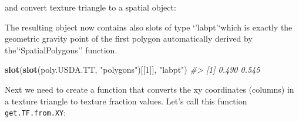 \documentclass[graybox,natbib,nospthms,UStrade]{svmono}
\newenvironment{Shaded}{\begin{snugshade}}{\end{snugshade}}
\newcommand{\CommentTok}[1]{\textcolor[rgb]{0.37,0.37,0.37}{\textit{#1}}}
\newcommand{\ControlFlowTok}[1]{\textcolor[rgb]{0.27,0.27,0.27}{\textbf{#1}}}
\newcommand{\DataTypeTok}[1]{\textcolor[rgb]{0.27,0.27,0.27}{#1}}
\newcommand{\DecValTok}[1]{\textcolor[rgb]{0.06,0.06,0.06}{#1}}
\newcommand{\FloatTok}[1]{\textcolor[rgb]{0.06,0.06,0.06}{#1}}
\newcommand{\KeywordTok}[1]{\textcolor[rgb]{0.27,0.27,0.27}{\textbf{#1}}}
\newcommand{\NormalTok}[1]{#1}
\newcommand{\OperatorTok}[1]{\textcolor[rgb]{0.43,0.43,0.43}{\textbf{#1}}}
\newcommand{\OtherTok}[1]{\textcolor[rgb]{0.37,0.37,0.37}{#1}}
\newcommand{\StringTok}[1]{\textcolor[rgb]{0.5,0.5,0.5}{#1}}
\begin{document}
and convert texture triangle to a spatial object:

\begin{Shaded}
\end{Shaded}

The resulting object now contains also slots of type `'labpt'`which is exactly the geometric gravity point of the first polygon automatically derived by the'`SpatialPolygons'' function.

\begin{Shaded}
\begin{Highlighting}[]
\KeywordTok{slot}\NormalTok{(}\KeywordTok{slot}\NormalTok{(poly.USDA.TT, }\StringTok{"polygons"}\NormalTok{)[[}\DecValTok{1}\NormalTok{]], }\StringTok{"labpt"}\NormalTok{)}
\CommentTok{#> [1] 0.490 0.545}
\end{Highlighting}
\end{Shaded}

Next we need to create a function that converts the xy coordinates (columns) in a texture triangle to texture fraction values. Let's call this function \texttt{get.TF.from.XY}:

\begin{Shaded}
\end{Shaded}
\end{document}
